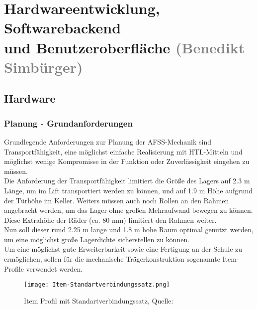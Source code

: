 \section{Hardwareentwicklung, Softwarebackend \\ und Benutzeroberfläche \textcolor{gray}{(Benedikt Simbürger)}}

\subsection{Hardware}

\subsubsection{Planung - Grundanforderungen} 
Grundlegende Anforderungen zur Planung der AFSS-Mechanik sind Transportfähigkeit, eine möglichst einfache Realisierung mit HTL-Mitteln und möglichst wenige Kompromisse in der Funktion oder Zuverlässigkeit eingehen zu müssen.\\
Die Anforderung der Transportfähigkeit limitiert die Größe des Lagers auf 2.3 m Länge, um im Lift transportiert werden zu können, und auf 1.9 m Höhe aufgrund der Türhöhe im Keller. Weiters müssen auch noch Rollen an den Rahmen angebracht werden, um das Lager ohne großen Mehraufwand bewegen zu können. Diese Extrahöhe der Räder (ca. 80 mm) limitiert den Rahmen weiter.\\
Nun soll dieser rund 2.25 m lange und 1.8 m hohe Raum optimal genutzt werden, um eine möglichst große Lagerdichte sicherstellen zu können.\\
Um eine möglichst gute Erweiterbarkeit sowie eine Fertigung an der Schule zu ermöglichen, sollen für die mechanische Trägerkonstruktion sogenannte Item-Profile verwendet werden.


\begin{wrapfigure}{r}{0.3\textwidth}
    \vspace{0mm}
    \texttt{[image: Item-Standartverbindungssatz.png]}
    \centering
    \caption{Item Profil mit Standartverbindungssatz, Quelle: \cite{Item_svs}}
    \label{sfs_item}
\end{wrapfigure}
